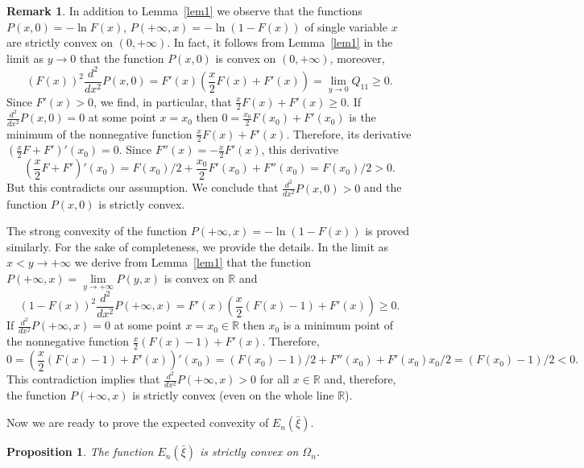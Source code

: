 \documentclass[12pt]{article}
\theoremstyle{plain}
\newtheorem{proposition}{Proposition}[section]
\theoremstyle{definition}
\newtheorem{remark}{Remark}[section]
\numberwithin{equation}{section}
\newcommand{\R}{{\mathbb R}}
\begin{document}
\begin{remark}\label{rem1}
In addition to Lemma~\ref{lem1} we observe that the functions $P(x,0)=-\ln F(x)$, $P(+\infty,x)=-\ln(1-F(x))$
of single variable $x$ are strictly convex on $(0,+\infty)$. In fact, it follows from Lemma~\ref{lem1} in the limit as $y\to 0$ that the function $P(x,0)$ is convex on $(0,+\infty)$, moreover,
\[
(F(x))^2\frac{d^2}{dx^2}P(x,0)=F'(x)(\frac{x}{2}F(x)+F'(x))=\lim_{y\to 0}Q_{11}\ge 0.
\]
Since $F'(x)>0$, we find, in particular, that $\frac{x}{2}F(x)+F'(x)\ge 0$.
If $\frac{d^2}{dx^2}P(x,0)=0$ at some point $x=x_0$ then $0=\frac{x_0}{2}F(x_0)+F'(x_0)$ is the minimum of the nonnegative function $\frac{x}{2}F(x)+F'(x)$. Therefore, its derivative $(\frac{x}{2}F+F')'(x_0)=0$. Since $F''(x)=-\frac{x}{2}F'(x)$, this derivative
\[
(\frac{x}{2}F+F')'(x_0)=F(x_0)/2+\frac{x_0}{2}F'(x_0)+F''(x_0)=F(x_0)/2>0.
\]
But this contradicts our assumption. We conclude that $\frac{d^2}{dx^2}P(x,0)>0$ and the function $P(x,0)$ is strictly convex.

The strong convexity of the function $P(+\infty,x)=-\ln(1-F(x))$ is proved similarly. For the sake of completeness, we
provide the details.
In the limit as $x<y\to+\infty$ we derive from Lemma~\ref{lem1} that the function $P(+\infty,x)=\lim\limits_{y\to+\infty}P(y,x)$ is convex on $\R$ and
\[(1-F(x))^2\frac{d^2}{dx^2}P(+\infty,x)=F'(x)(\frac{x}{2}(F(x)-1)+F'(x))\ge 0.\]
If $\displaystyle\frac{d^2}{dx^2}P(+\infty,x)=0$ at some point $x=x_0\in\R$ then $x_0$ is a minimum point of the nonnegative function
$\frac{x}{2}(F(x)-1)+F'(x)$. Therefore,
\[
0=(\frac{x}{2}(F(x)-1)+F'(x))'(x_0)=(F(x_0)-1)/2+F''(x_0)+F'(x_0)x_0/2=(F(x_0)-1)/2<0.
\]
This contradiction implies that $\displaystyle\frac{d^2}{dx^2}P(+\infty,x)>0$ for all $x\in\R$ and, therefore, the function $P(+\infty,x)$ is strictly convex (even on the whole line $\R$).
\end{remark}

Now we are ready to prove the expected convexity of $E_n(\bar\xi)$.

\begin{proposition}\label{th2}
The function $E_n(\bar\xi)$ is strictly convex on $\Omega_n$.
\end{proposition}
\end{document}
